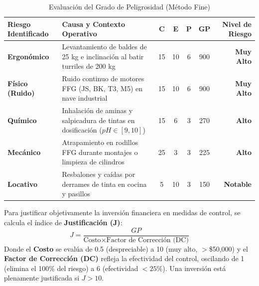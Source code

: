 \documentclass[11pt, letterpaper]{article}
\begin{document}
\begin{table}[H]
    \centering
    \small
    \caption{Evaluación del Grado de Peligrosidad (Método Fine)}
    \begin{tabular}{lp{6cm}ccccr}
        \toprule
        \textbf{Riesgo Identificado} & \textbf{Causa y Contexto Operativo} & \textbf{C} & \textbf{E} & \textbf{P} & \textbf{GP} & \textbf{Nivel de Riesgo} \\
        \midrule
        \textbf{Ergonómico} & Levantamiento de baldes de 25 kg e inclinación al batir turriles de 200 kg & 15 & 10 & 6 & 900 & \textbf{Muy Alto} \\
        \textbf{Físico (Ruido)} & Ruido continuo de motores FFG (JS, BK, T3, M5) en nave industrial & 15 & 10 & 6 & 900 & \textbf{Muy Alto} \\
        \textbf{Químico} & Inhalación de aminas y salpicadura de tintas en dosificación ($pH \in [9,10]$) & 15 & 6 & 3 & 270 & \textbf{Alto} \\
        \textbf{Mecánico} & Atrapamiento en rodillos FFG durante montajes o limpieza de cilindros & 25 & 3 & 3 & 225 & \textbf{Alto} \\
        \textbf{Locativo} & Resbalones y caídas por derrames de tinta en cocina y pasillos & 5 & 10 & 3 & 150 & \textbf{Notable} \\
        \bottomrule
    \end{tabular}
\end{table}

Para justificar objetivamente la inversión financiera en medidas de control, se calcula el índice de \textbf{Justificación (J)}:
\begin{equation}
    J = \frac{GP}{\text{Costo} \times \text{Factor de Corrección (DC)}}
\end{equation}
Donde el \textbf{Costo} se evalúa de 0.5 (despreciable) a 10 (muy alto, $>$\$50,000) y el \textbf{Factor de Corrección (DC)} refleja la efectividad del control, oscilando de 1 (elimina el 100\% del riesgo) a 6 (efectividad $<25\%$). Una inversión está plenamente justificada si $J > 10$.
\end{document}
